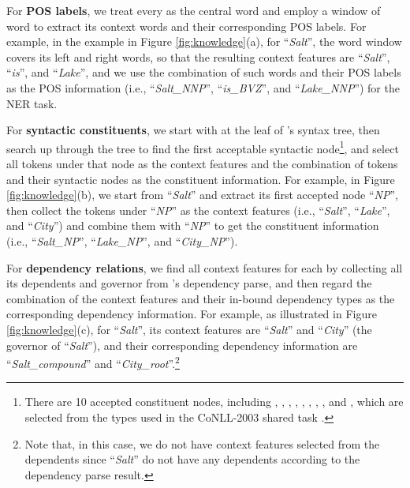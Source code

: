 \documentclass[11pt,a4paper]{article}
\begin{document}
\vspace{0.2cm}
For \textbf{POS labels}, we treat every  as the central word and employ a window of  word to extract its context words and their corresponding POS labels.
For example, in the example in Figure \ref{fig:knowledge}(a), for ``\textit{Salt}'', the  word window covers its left and right words, so that the resulting context features are ``\textit{Salt}'', ``\textit{is}'', and ``\textit{Lake}'', and we use the combination of such words and their POS labels as the POS information (i.e., ``\textit{Salt\_NNP}'', ``\textit{is\_BVZ}'', and ``\textit{Lake\_NNP}'') for the NER task.


\vspace{0.2cm}

For \textbf{syntactic constituents}, we start with  at the leaf of 's syntax tree, then search up through the tree to find the first acceptable syntactic node\footnote{There are 10 accepted constituent nodes, including , , , , , , , ,  and , which are selected from the types used in the CoNLL-2003 shared task \cite{DBLP:conf/conll/SangM03}.}, and select all tokens under that node as the context features and the combination of tokens and their syntactic nodes as the constituent information.
For example, in Figure \ref{fig:knowledge}(b), we start from ``\textit{Salt}'' and extract its first accepted node ``\textit{NP}'', then collect the tokens under ``\textit{NP}'' as the context features (i.e., ``\textit{Salt}'', ``\textit{Lake}'', and ``\textit{City}'') and combine them with ``\textit{NP}'' to get the constituent information (i.e., ``\textit{Salt\_{NP}}'', ``\textit{Lake\_{NP}}'', and ``\textit{City\_{NP}}'').

\vspace{0.2cm}

For \textbf{dependency relations}, we find all context features for each  by collecting all its dependents and governor from 's dependency parse, 
and then regard the combination of the context features and their in-bound dependency types as the corresponding dependency information.
For example, as illustrated in Figure \ref{fig:knowledge}(c), for ``\textit{Salt}'', its context features are ``\textit{Salt}'' and ``\textit{City}'' (the governor of ``\textit{Salt}''), and their corresponding dependency information are ``\textit{Salt\_compound}'' and ``\textit{City\_root}''.\footnote{
Note that, in this case, we do not have context features selected from the dependents since ``\textit{Salt}'' do not have any dependents according to the dependency parse result.}
\end{document}
